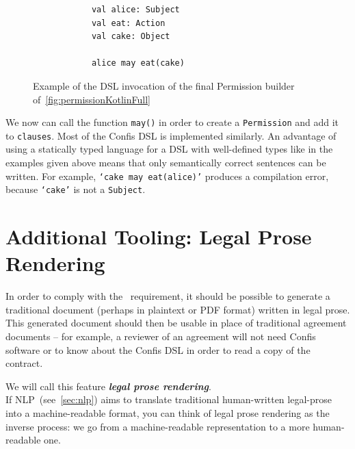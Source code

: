 \begin{figure}[h]
    \centering
    \begin{minipage}{0.5\textwidth}
        \begin{verbatim}
            val alice: Subject
            val eat: Action
            val cake: Object

            alice may eat(cake)
        \end{verbatim}
    \end{minipage}
    \caption{Example of the DSL invocation of the final Permission builder of~\autoref{fig:permissionKotlinFull}}
    \label{fig:finalPermissionInvocationDSL}
\end{figure}

We now can call the function \texttt{may()} in order to create a \texttt{Permission} and add it to \texttt{clauses}.
Most of the Confis DSL is implemented similarly.
An advantage of using a statically typed language for a DSL with well-defined types like in the examples given above means that only semantically correct sentences can be written.
For example, \texttt{`cake may eat(alice)'} produces a compilation error, because \texttt{`cake'} is not a \texttt{Subject}.\\




\section{Additional Tooling: Legal Prose Rendering}\label{sec:additional-tooling:doc-rendering}

In order to comply with the~ requirement, it should be possible to generate a traditional document (perhaps in plaintext or PDF format) written in legal prose.
This generated document should then be usable in place of traditional agreement documents -- for example, a reviewer of an agreement will not need Confis software or to know about the Confis DSL in order to read a copy of the contract.

We will call this feature \textbf{\emph{legal prose rendering}}.\\

If NLP~(see~\autoref{sec:nlp}) aims to translate traditional human-written legal-prose into a machine-readable format, you can think of legal prose rendering as the inverse process: we go from a machine-readable representation to a more human-readable one.

